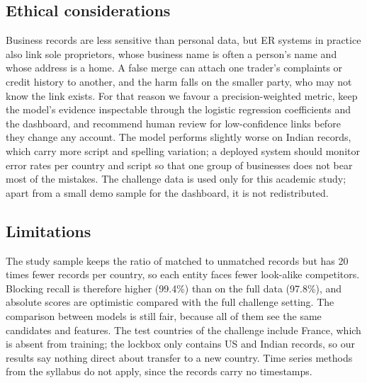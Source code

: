 \subsection{Ethical considerations}
Business records are less sensitive than personal data, but ER systems in practice also link sole proprietors,
whose business name is often a person's name and whose address is a home. A false merge can attach one trader's
complaints or credit history to another, and the harm falls on the smaller party, who may not know the link
exists. For that reason we favour a precision-weighted metric, keep the model's evidence inspectable through the
logistic regression coefficients and the dashboard, and recommend human review for low-confidence links before they
change any account. The model performs slightly worse on Indian records, which carry more script and spelling
variation; a deployed system should monitor error rates per country and script so that one group of businesses
does not bear most of the mistakes. The challenge data is used only for this academic study; apart from a small demo
sample for the dashboard, it is not redistributed.

\subsection{Limitations}
The study sample keeps the ratio of matched to unmatched records but has 20 times fewer records per country, so
each entity faces fewer look-alike competitors. Blocking recall is therefore higher (99.4\%) than on the full data
(97.8\%), and absolute scores are optimistic compared with the full challenge setting. The comparison between
models is still fair, because all of them see the same candidates and features. The test countries of the
challenge include France, which is absent from training; the lockbox only contains US and Indian records, so our
results say nothing direct about transfer to a new country. Time series methods from the syllabus do not apply,
since the records carry no timestamps.
